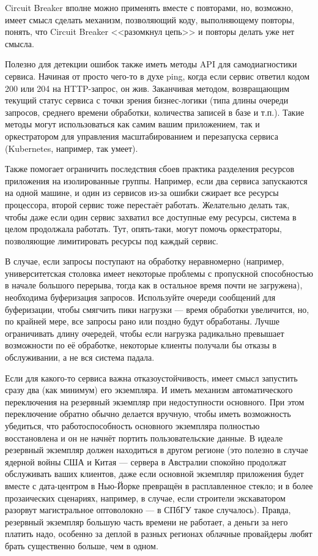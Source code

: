 \documentclass[a5paper]{article}
\begin{document}
Circuit Breaker вполне можно применять вместе с повторами, но, возможно, имеет смысл сделать механизм, позволяющий коду, выполняющему повторы, понять, что Circuit Breaker <<разомкнул цепь>> и повторы делать уже нет смысла.

Полезно для детекции ошибок также иметь методы API для самодиагностики сервиса. Начиная от просто чего-то в духе ping, когда если сервис ответил кодом 200 или 204 на HTTP-запрос, он жив. Заканчивая методом, возвращающим текущий статус сервиса с точки зрения бизнес-логики (типа длины очереди запросов, среднего времени обработки, количества записей в базе и т.п.). Такие методы могут использоваться как самим вашим приложением, так и оркестратором для управления масштабированием и перезапуска сервиса (Kubernetes, например, так умеет).

Также помогает ограничить последствия сбоев практика разделения ресурсов приложения на изолированные группы. Например, если два сервиса запускаются на одной машине, и один из сервисов из-за ошибки сжирает все ресурсы процессора, второй сервис тоже перестаёт работать. Желательно делать так, чтобы даже если один сервис захватил все доступные ему ресурсы, система в целом продолжала работать. Тут, опять-таки, могут помочь оркестраторы, позволяющие лимитировать ресурсы под каждый сервис.

В случае, если запросы поступают на обработку неравномерно (например, университетская столовка имеет некоторые проблемы с пропускной способностью в начале большого перерыва, тогда как в остальное время почти не загружена), необходима буферизация запросов. Используйте очереди сообщений для буферизации, чтобы смягчить пики нагрузки --- время обработки увеличится, но, по крайней мере, все запросы рано или поздно будут обработаны. Лучше ограничивать длину очередей, чтобы если нагрузка радикально превышает возможности по её обработке, некоторые клиенты получали бы отказы в обслуживании, а не вся система падала.

Если для какого-то сервиса важна отказоустойчивость, имеет смысл запустить сразу два (как минимум) его экземпляра. И иметь механизм автоматического переключения на резервный экземпляр при недоступности основного. При этом переключение обратно обычно делается вручную, чтобы иметь возможность убедиться, что работоспособность основного экземпляра полностью восстановлена и он не начнёт портить пользовательские данные. В идеале резервный экземпляр должен находиться в другом регионе (это полезно в случае ядерной войны США и Китая --- сервера в Австралии спокойно продолжат обслуживать ваших клиентов, даже если основной экземпляр приложения будет вместе с дата-центром в Нью-Йорке превращён в расплавленное стекло; и в более прозаических сценариях, например, в случае, если строители экскаватором разорвут магистральное оптоволокно --- в СПбГУ такое случалось). Правда, резервный экземпляр большую часть времени не работает, а деньги за него платить надо, особенно за деплой в разных регионах облачные провайдеры любят брать существенно больше, чем в одном.
\end{document}
